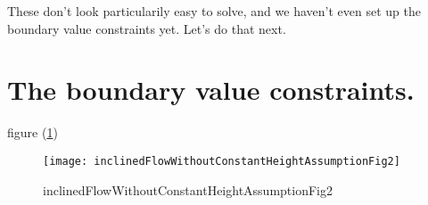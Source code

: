 These don't look particularily easy to solve, and we haven't even set up the boundary value constraints yet.  Let's do that next.

\section{The boundary value constraints.}

figure (\ref{fig:inclinedFlowWithoutConstantHeightAssumption:inclinedFlowWithoutConstantHeightAssumptionFig2})
\begin{figure}[htp]
   \centering
   \texttt{[image: inclinedFlowWithoutConstantHeightAssumptionFig2]}
   \caption{inclinedFlowWithoutConstantHeightAssumptionFig2}\label{fig:inclinedFlowWithoutConstantHeightAssumption:inclinedFlowWithoutConstantHeightAssumptionFig2}
\end{figure}

\EndNoBibArticle
